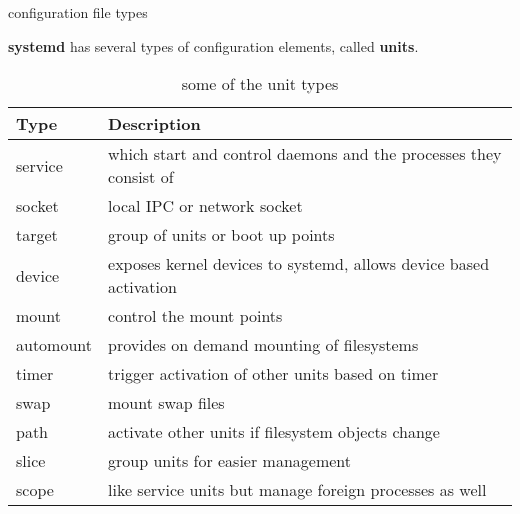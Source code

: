 \begin{frame} 
	{configuration file types}

	\textbf{systemd} has several types of configuration elements, called \textbf{units}.
	   \begin{longtable}{| m{5em} | m{30em} | }
                \caption{some of the unit types} \\
                \hline
		   \textbf{Type}                        &
                \textbf{Description}                    \\
                \hline
                service                                &
               which start and control daemons and the processes they consist of  \\
                \hline
		   socket &
                local IPC  or network socket      \\
                \hline
		target &
		group of units or boot up points \\
		\hline
		 device &
		 exposes kernel devices to systemd, allows device based activation \\
		   \hline
		   mount &
		   control the mount points \\
		   \hline
		   automount &
		   provides on demand mounting of filesystems \\
		   \hline
		   timer  &
		   trigger activation of other units based on timer\\
		   \hline
		   swap &
		   mount swap files \\
		   \hline
		   path & 
		   activate other units if filesystem objects change \\
		   \hline 
		   slice &
		   group units for easier management \\
		   \hline
		   scope &
		   like service units but manage foreign processes as well \\
		   \hline
		   

        \end{longtable}

\end{frame}

\cprotect\note{

}

